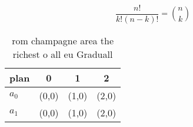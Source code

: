 \documentclass[a4paper]{article}
\begin{document}
\[ \frac{n!}{k!(n-k)!} = \binom{n}{k} \]

\begin{table}
\begin{adjustbox}{width=0.6\columnwidth}
\begin{tabular}{|l|l|l|l|}
\hline
\textbf{plan} & \multicolumn{1}{c|}{\textbf{0}} & \multicolumn{1}{c|}{\textbf{1}} & \multicolumn{1}{c|}{\textbf{2}} \\ \hline
\textbf{$a_0$}  & (0,0) & (1,0) & (2,0) \\ \hline
\textbf{$a_1$}  & (0,0) & (1,0) & (2,0) \\ \hline
\end{tabular}
\end{adjustbox}
\caption{ rom champagne area the richest o all eu Graduall
}
\end{table}
\end{document}
